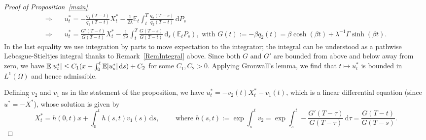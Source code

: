 \documentclass[openany,oneside]{article}
\theoremstyle{definition}
\theoremstyle{remark}
\newcommand{\E}{\mathbb{E}} %
\DeclarePairedDelimiter{\abs}{\lvert}{\rvert} %
\newcommand{\ts}{\textstyle}
\newcommand{\de}{\,\mathrm{d}}
\begin{document}
\begin{proof}[Proof of Proposition~\ref{main}]
\begin{align*}
\Rightarrow\quad &\ts u^\ast_t = -\frac{q_1(T-t)}{q_2(T-t)} X^\ast_t - \frac{1}{2\lambda} \E_t\int_t^T\frac{q_2(T-s)}{q_2(T-t)} \de P_s \\
\Rightarrow\quad &\ts u^\ast_t = \frac{G'(T-t)}{G(T-t)} X^\ast_t - \frac{1}{2\lambda} \int_t^T \frac{G(T-s)}{G(T-t)} \de _s(\E_t P_s), \textrm{ with } G(t):=-\beta q_2(t) = \beta\cosh(\beta t)+\lambda^{-1}\Gamma\sinh(\beta t).
\end{align*}
In the last equality we use integration by parts to move expectation to the integrator; the integral can be understood as a pathwise Lebesgue-Stieltjes integral thanks to Remark~\ref{RemIntegral} above. Since both $G$ and $G'$ are bounded from above and below away from zero, we have $\E\abs{u^\ast_t} \le C_1 (x+\int_0^t \E\abs{u^\ast_s} \de s) + C_2$ for some $C_1, C_2 > 0$. Applying Gronwall's lemma, we find that $t\mapsto u^\ast_t$ is bounded in $L^1(\Omega)$ and hence admissible.

Defining $v_2$ and $v_1$ as in the statement of the proposition, we have $u^\ast_t = -v_2(t)X^\ast_t -v_1(t)$, which is a linear differential equation (since $u^\ast=-\dot{X^\ast}$), whose solution is given by
\[
\ts X^\ast_t = h(0,t)x + \int_0^t h(s,t)v_1(s) \de s,\qquad \textrm{ where } h(s,t):=\exp\int_s^t v_2 = \exp\int_s^t -\frac{G'(T-\tau)}{G(T-\tau)}\de \tau=\frac{G(T-t)}{G(T-s)}.
\]


\end{proof}
\end{document}
